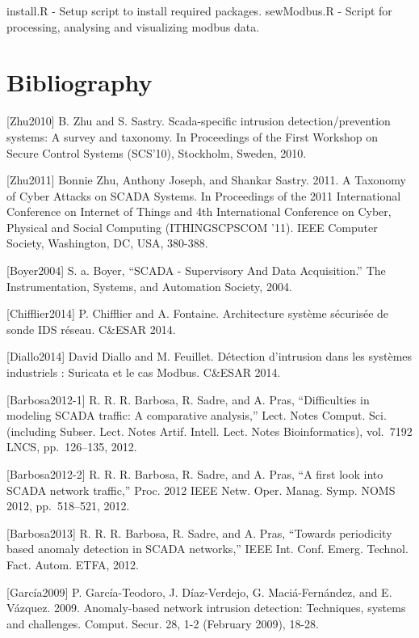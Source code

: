 \documentclass[12pt,]{article}
\begin{document}
install.R - Setup script to install required packages. sewModbus.R -
Script for processing, analysing and visualizing modbus data.

\thispagestyle{empty} \pagebreak

\section*{Bibliography}\label{bibliography}

{[}Zhu2010{]} B. Zhu and S. Sastry. Scada-specific intrusion
detection/prevention systems: A survey and taxonomy. In Proceedings of
the First Workshop on Secure Control Systems (SCS'10), Stockholm,
Sweden, 2010.

{[}Zhu2011{]} Bonnie Zhu, Anthony Joseph, and Shankar Sastry. 2011. A
Taxonomy of Cyber Attacks on SCADA Systems. In Proceedings of the 2011
International Conference on Internet of Things and 4th International
Conference on Cyber, Physical and Social Computing (ITHINGSCPSCOM '11).
IEEE Computer Society, Washington, DC, USA, 380-388.

{[}Boyer2004{]} S. a. Boyer, ``SCADA - Supervisory And Data
Acquisition.'' The Instrumentation, Systems, and Automation Society,
2004.

{[}Chifflier2014{]} P. Chifflier and A. Fontaine. Architecture système
sécurisée de sonde IDS réseau. C\&ESAR 2014.

{[}Diallo2014{]} David Diallo and M. Feuillet. Détection d'intrusion
dans les systèmes industriels : Suricata et le cas Modbus. C\&ESAR 2014.

{[}Barbosa2012-1{]} R. R. R. Barbosa, R. Sadre, and A. Pras,
``Difficulties in modeling SCADA traffic: A comparative analysis,''
Lect. Notes Comput. Sci. (including Subser. Lect. Notes Artif. Intell.
Lect. Notes Bioinformatics), vol.~7192 LNCS, pp.~126--135, 2012.

{[}Barbosa2012-2{]} R. R. R. Barbosa, R. Sadre, and A. Pras, ``A first
look into SCADA network traffic,'' Proc. 2012 IEEE Netw. Oper. Manag.
Symp. NOMS 2012, pp.~518--521, 2012.

{[}Barbosa2013{]} R. R. R. Barbosa, R. Sadre, and A. Pras, ``Towards
periodicity based anomaly detection in SCADA networks,'' IEEE Int. Conf.
Emerg. Technol. Fact. Autom. ETFA, 2012.

{[}García2009{]} P. García-Teodoro, J. Díaz-Verdejo, G. Maciá-Fernández,
and E. Vázquez. 2009. Anomaly-based network intrusion detection:
Techniques, systems and challenges. Comput. Secur. 28, 1-2 (February
2009), 18-28.
\end{document}
